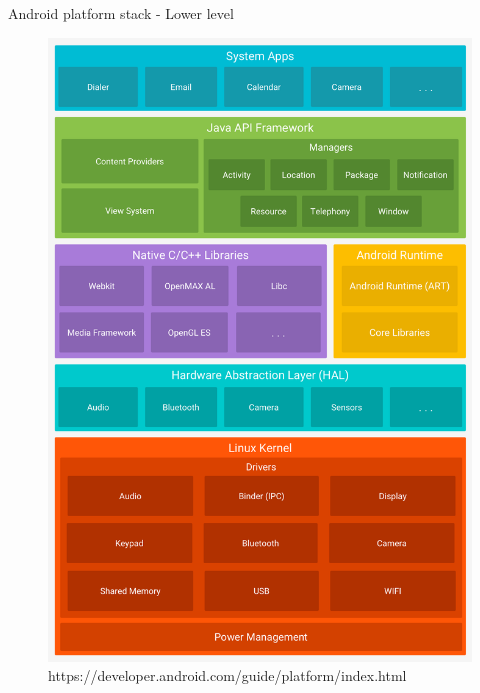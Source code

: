 \documentclass{beamer}
\begin{document}
  \begin{frame}{Android platform stack - Lower level}
    \begin{center}
        \begin{figure}
            \includegraphics[clip, trim=0 0 0 37cm, width=.8\paperwidth]{android-stack}
            \caption{https://developer.android.com/guide/platform/index.html}
        \end{figure}
    \end{center}
\end{frame}
\end{document}
